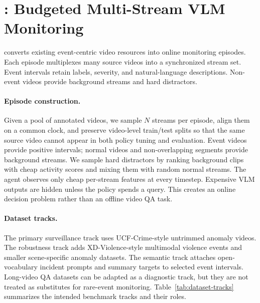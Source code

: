 \section{\benchmark: Budgeted Multi-Stream VLM Monitoring}

\benchmark{} converts existing event-centric video resources into online monitoring episodes. Each episode multiplexes many source videos into a synchronized stream set. Event intervals retain labels, severity, and natural-language descriptions. Non-event videos provide background streams and hard distractors.

\paragraph{Episode construction.}
Given a pool of annotated videos, we sample $N$ streams per episode, align them on a common clock, and preserve video-level train/test splits so that the same source video cannot appear in both policy tuning and evaluation. Event videos provide positive intervals; normal videos and non-overlapping segments provide background streams. We sample hard distractors by ranking background clips with cheap activity scores and mixing them with random normal streams. The agent observes only cheap per-stream features at every timestep. Expensive VLM outputs are hidden unless the policy spends a query. This creates an online decision problem rather than an offline video QA task.

\paragraph{Dataset tracks.}
The primary surveillance track uses UCF-Crime-style untrimmed anomaly videos. The robustness track adds XD-Violence-style multimodal violence events and smaller scene-specific anomaly datasets. The semantic track attaches open-vocabulary incident prompts and summary targets to selected event intervals. Long-video QA datasets can be adapted as a diagnostic track, but they are not treated as substitutes for rare-event monitoring. Table~\ref{tab:dataset-tracks} summarizes the intended benchmark tracks and their roles.

\begin{table}[t]
\centering
\small
\caption{Dataset tracks used by \benchmark. The benchmark is defined at the episode level: each source video becomes one possible stream in a multi-stream online episode.}
\label{tab:dataset-tracks}

\end{table}

